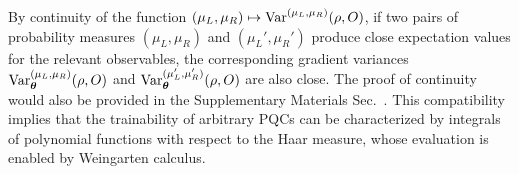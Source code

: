 \documentclass[%
 superscriptaddress,
 aps,prl,
 reprint,
 twocolumn,
 amsmath,amssymb,showpacs,
 bibnotes,
]{revtex4-2}
\newcommand{\RomanNumeralCaps}[1]
    {\MakeUppercase{\romannumeral #1}}
\begin{document}
By continuity of the function $(\mu_L, \mu_R)\mapsto{\rm Var}^{(\mu_L,\mu_R)}(\rho, O)$, if two pairs of probability measures $(\mu_L,\mu_R)$ and $(\mu_L',\mu_R')$ produce close expectation values for the relevant observables, the corresponding gradient variances ${\rm Var}_{\boldsymbol\theta}^{(\mu_L,\mu_R)}(\rho, O)$ and ${\rm Var}_{\boldsymbol\theta}^{(\mu_L',\mu_R')}(\rho, O)$ are also close. The proof of continuity would also be provided in the Supplementary Materials Sec.~\RomanNumeralCaps{3}. This compatibility implies that the trainability of arbitrary PQCs can be characterized by integrals of polynomial functions with respect to the Haar measure, whose evaluation is enabled by Weingarten calculus. 
\end{document}

